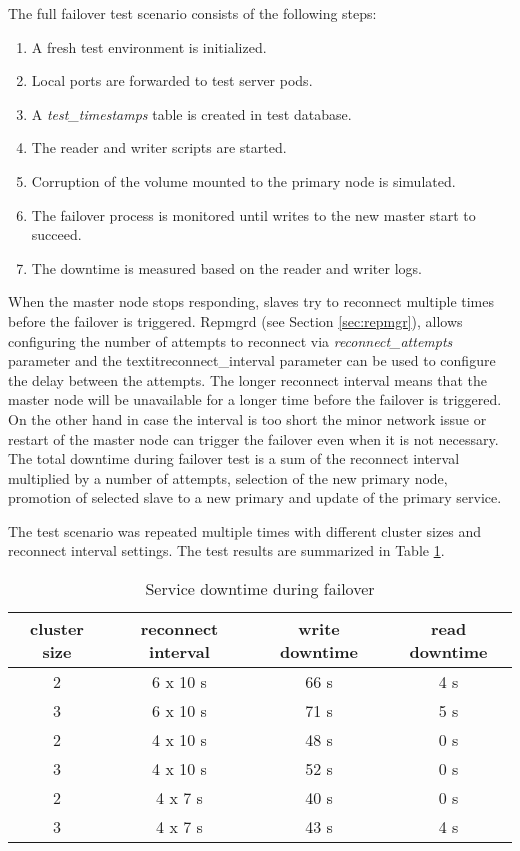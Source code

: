 \documentclass[
  digital, %
  twoside, %
  table,   %
  nolof,   %
  nolot,   %
]{fithesis3}
\begin{document}
The full failover test scenario consists of the following steps:
\begin{enumerate}
  \item  A fresh test environment is initialized. 
  \item Local ports are forwarded to test server pods.
  \item A \textit{test\_timestamps} table is created in test database.
  \item The reader and writer scripts are started.
  \item Corruption of the volume mounted to the primary node is simulated.
  \item The failover process is monitored until writes to the new master start to succeed.
  \item The downtime is measured based on the reader and writer logs.
\end{enumerate}

When the master node stops responding, slaves try to reconnect multiple times before the failover is triggered. Repmgrd (see Section \ref{sec:repmgr}), allows configuring the number of attempts to reconnect via \textit{reconnect\_attempts} parameter and the textit{reconnect\_interval} parameter can be used to configure the delay between the attempts. The longer reconnect interval means that the master node will be unavailable for a longer time before the failover is triggered. On the other hand in case the interval is too short the minor network issue or restart of the master node can trigger the failover even when it is not necessary. The total downtime during failover test is a sum of the reconnect interval multiplied by a number of attempts, selection of the new primary node, promotion of selected slave to a new primary and update of the primary service.

The test scenario was repeated multiple times with different cluster sizes and reconnect interval settings. The test results are summarized in Table \ref{table:failover_testing}.

\begin{table}[ht!]
\centering
\begin{tabular}{|c c c c|}
 \hline
 cluster size & reconnect interval & write downtime & read downtime \\ [0.5ex]
 \hline
 2 & 6 x 10 s & 66 s & 4 s \\
 3 & 6 x 10 s & 71 s & 5 s \\
 2 & 4 x 10 s & 48 s & 0 s \\
 3 & 4 x 10 s & 52 s & 0 s \\
 2 & 4 x 7 s  & 40 s & 0 s  \\
 3 & 4 x 7 s  & 43 s & 4 s  \\ [1ex]
 \hline
\end{tabular}
\caption{Service downtime during failover}
\label{table:failover_testing}
\end{table}
\end{document}
